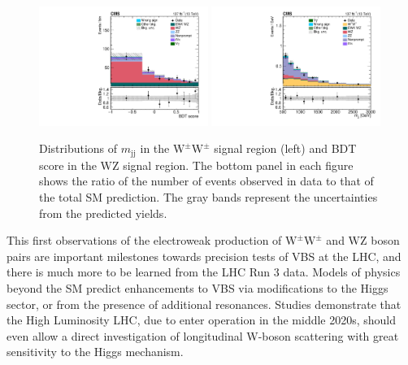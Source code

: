 \documentclass[12pt]{article}
\newcommand{\WZ}{\ensuremath{\mathrm{W}\mathrm{Z}}}
\newcommand{\WW}{\ensuremath{\mathrm{W}^\pm\mathrm{W}^\pm}}
\newcommand{\jet}{\ensuremath{\mathrm{j}}}
\newcommand{\mjj}{\ensuremath{m_{\jet\jet}}}
\begin{document}
\begin{figure}[htb]
\centering
\includegraphics[width=0.49\textwidth]{figures/ssww_wzsel_bdt_2019.pdf}
\includegraphics[width=0.49\textwidth]{figures/ssww_wwsel_mjj_2019.pdf}
\caption{Distributions of $\mjj$ in the $\WW$ signal region (left) and  BDT score in the $\WZ$ signal region. The bottom panel in each figure
shows the ratio of the number of events observed in data to that of the total SM prediction.
The gray bands represent the uncertainties from the predicted yields.}
\label{fig:signal}
\end{figure}

This first observations of the  electroweak production of $\WW$ and $\WZ$  boson pairs are important milestones towards precision tests of VBS at the LHC, and there is much more to be learned from the LHC Run 3 data. Models of physics beyond the SM predict enhancements to VBS via modifications to the Higgs sector, or from the presence of additional resonances. Studies demonstrate that the High Luminosity LHC, due to enter operation in the middle 2020s, should even allow a direct investigation of longitudinal W-boson scattering with great sensitivity to the Higgs mechanism.
\end{document}
